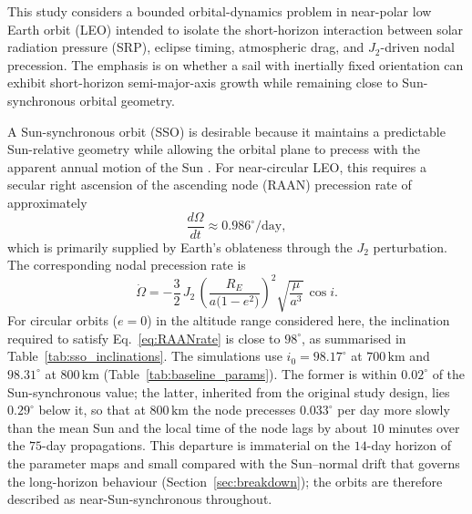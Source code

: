 \FloatBarrier
\noindent This study considers a bounded orbital-dynamics problem in near-polar low Earth orbit (LEO) intended to isolate the short-horizon interaction between solar radiation pressure (SRP), eclipse timing, atmospheric drag, and \(J_2\)-driven nodal precession. The emphasis is on whether a sail with inertially fixed orientation can exhibit short-horizon semi-major-axis growth while remaining close to Sun-synchronous orbital geometry.

\vspace{5pt}
\par\noindent A Sun-synchronous orbit (SSO) is desirable because it maintains a predictable Sun-relative geometry while allowing the orbital plane to precess with the apparent annual motion of the Sun \citep{vallado2007}. For near-circular LEO, this requires a secular right ascension of the ascending node (RAAN) precession rate of approximately
\begin{equation}
\frac{d\Omega}{dt} \approx 0.986^\circ/\text{day},
\label{eq:RAANrate}
\end{equation}
which is primarily supplied by Earth’s oblateness through the \(J_2\) perturbation. The corresponding nodal precession rate is \citep{vallado2007}
\begin{equation}
\dot{\Omega}
  = -\frac{3}{2}\,J_2\,
      \left(\frac{R_{E}}{a\bigl(1-e^{2}\bigr)}\right)^{\!2}
      \sqrt{\frac{\mu}{a^{3}}}\,
      \cos i.
\end{equation}
For circular orbits (\(e=0\)) in the altitude range considered here, the inclination required to satisfy Eq.~\eqref{eq:RAANrate} is close to \(98^\circ\), as summarised in Table~\ref{tab:sso_inclinations}. The simulations use \(i_0 = 98.17^\circ\) at \(700\,\mathrm{km}\) and \(98.31^\circ\) at \(800\,\mathrm{km}\) (Table~\ref{tab:baseline_params}). The former is within \(0.02^\circ\) of the Sun-synchronous value; the latter, inherited from the original study design, lies \(0.29^\circ\) below it, so that at \(800\,\mathrm{km}\) the node precesses \(0.033^\circ\) per day more slowly than the mean Sun and the local time of the node lags by about \(10\) minutes over the \(75\)-day propagations. This departure is immaterial on the \(14\)-day horizon of the parameter maps and small compared with the Sun--normal drift that governs the long-horizon behaviour (Section~\ref{sec:breakdown}); the orbits are therefore described as near-Sun-synchronous throughout.


